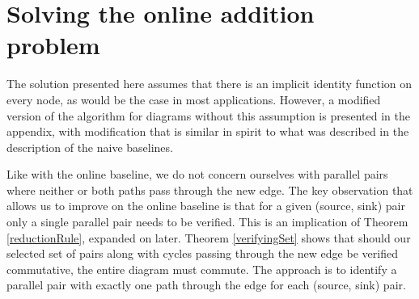 \documentclass{article}
\begin{document}

\section{Solving the online addition problem}

The solution presented here assumes that there is an implicit identity function on every node, as would be the case in most applications. However, a modified version of the algorithm for diagrams without this assumption is presented in the appendix, with modification that is similar in spirit to what was described in the description of the naive baselines.

Like with the online baseline, we do not concern ourselves with parallel pairs where neither or both paths pass through the new edge.
The key observation that allows us to improve on the online baseline is that for a given (source, sink) pair only a single parallel pair needs to be verified. This is an implication of Theorem \ref{reductionRule}, expanded on later.
Theorem \ref{verifyingSet} shows that should our selected set of pairs along with cycles passing through the new edge be verified commutative, the entire diagram must commute. The approach is to identify a parallel pair with exactly one path through the edge for each (source, sink) pair.
\end{document}
